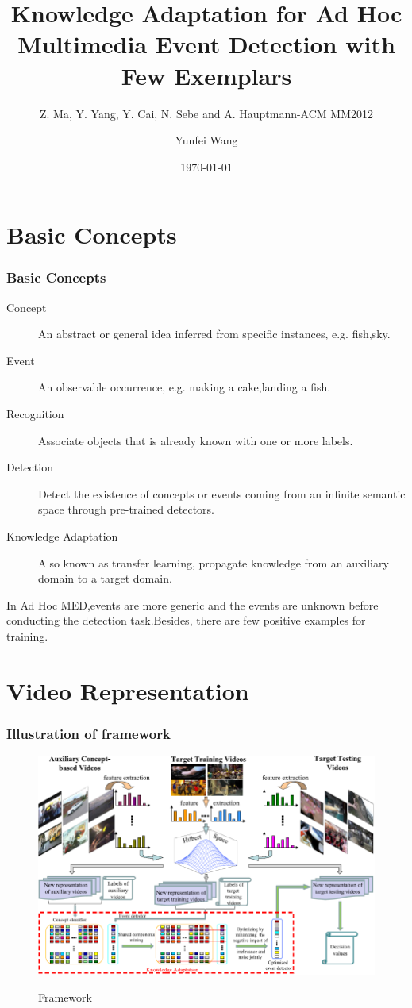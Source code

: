 \documentclass{beamer}
\title{Knowledge Adaptation for Ad Hoc Multimedia Event Detection with Few Exemplars}
\subtitle{Z. Ma, Y. Yang, Y. Cai, N. Sebe and A. Hauptmann-ACM MM2012}
\author{Yunfei Wang}
\institute{Department of Computer Science \& Technology\\Huazhong University of Science \& Technology}
\date{\today}
\begin{document}
\begin{frame}
\titlepage
\end{frame}

\begin{frame}
\tableofcontents
\end{frame}

\section{Basic Concepts}
\begin{frame}\frametitle{Basic Concepts}
\begin{description}
  \item[Concept] An abstract or general idea inferred from specific instances, e.g. fish,sky.
  \item[Event] An observable occurrence, e.g. making a cake,landing a fish.
  \item[Recognition] Associate objects that is already known with one or more labels.
  \item[Detection] Detect the existence of concepts or events coming from an infinite semantic space through pre-trained detectors.
  \item[Knowledge Adaptation] Also known as transfer learning, propagate knowledge from an auxiliary domain to a target domain.
\end{description}
In Ad Hoc MED,events are more generic and the events are unknown before conducting the detection task.Besides, there are few positive examples for training.
\end{frame}

\section{Video Representation}
\begin{frame}\frametitle{Illustration of framework}
\begin{figure}
  \centering
  \includegraphics[scale=0.46]{images/framework}\\
  \caption{Framework}\label{pic:framework}
\end{figure}
\end{frame}
\end{document}
